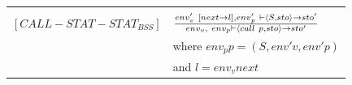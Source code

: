 \begin{center}
\begin{tabular}{ l l}
\hline
& \\
$[CALL-STAT-STAT_{BSS}]$ & $env'_{v}~[next \rightarrow l], env'_{p}~ \vdash \langle S,sto \rangle \rightarrow sto' \over env_{v}, ~ env_{p} \vdash \langle call~p, sto \rangle \rightarrow sto'$ \\
& where $env_{p}p = (S,env'{v},env'{p})$ \\
& and $l = env_{v}next$ \\
\hline
\end{tabular}
\end{center}







